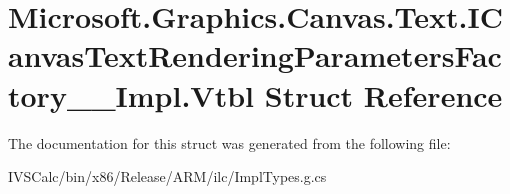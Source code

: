 \hypertarget{struct_microsoft_1_1_graphics_1_1_canvas_1_1_text_1_1_i_canvas_text_rendering_parameters_factory_____impl_1_1_vtbl}{}\section{Microsoft.\+Graphics.\+Canvas.\+Text.\+I\+Canvas\+Text\+Rendering\+Parameters\+Factory\+\_\+\+\_\+\+Impl.\+Vtbl Struct Reference}
\label{struct_microsoft_1_1_graphics_1_1_canvas_1_1_text_1_1_i_canvas_text_rendering_parameters_factory_____impl_1_1_vtbl}


The documentation for this struct was generated from the following file\+:\begin{DoxyCompactItemize}
\item 
I\+V\+S\+Calc/bin/x86/\+Release/\+A\+R\+M/ilc/Impl\+Types.\+g.\+cs\end{DoxyCompactItemize}
